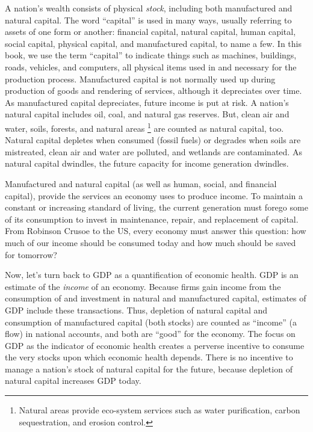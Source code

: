 A nation's wealth consists of physical \emph{stock},  
including both manufactured and natural capital. 
The word ``capital'' is used in many ways, usually referring to assets
of one form or another: 
financial capital, 
natural capital, 
human capital, 
social capital,
physical capital, and
manufactured capital, 
to name a few.
In this book, 
we use the term ``capital'' to indicate things such as
machines, 
buildings, 
roads,
vehicles, and
computers,
all physical items used in and necessary for the production process.
Manufactured capital is not normally used up during production 
of goods and rendering of services, 
although it depreciates over time.
As manufactured capital depreciates, future income is put at risk.
A nation's natural capital includes oil, coal, and natural gas reserves.
But, clean air and water, soils, forests, and natural areas%
	\footnote{
	Natural areas provide eco-system services such as 
	water purification, 
	carbon sequestration, 
	and erosion control.
	}
are counted as natural capital, too.
Natural capital depletes when consumed (fossil fuels)
or degrades when 
soils are mistreated, 
clean air and water are polluted, 
and wetlands are contaminated. 
As natural capital dwindles, the future
capacity for income generation dwindles. 

Manufactured and natural capital
(as well as human, social, and financial capital), 
provide the services an economy uses to produce income. 
To maintain a constant or increasing
standard of living, the current generation must
forego some of its consumption to 
invest in maintenance, repair, and
replacement of capital. 
From Robinson Crusoe to the US, 
every economy must answer this question: 
how much of our income should be consumed today and how much should be saved
for tomorrow?

Now, let's turn back to GDP as a quantification of economic health.
GDP is an estimate of the \emph{income} of an economy.
Because firms gain income from the 
consumption of and investment in 
natural and manufactured capital,
estimates of GDP include these transactions.
Thus, depletion of natural capital and
consumption of manufactured capital (both stocks) 
are counted as ``income'' (a flow) in national accounts,
and both are ``good'' for the economy.
The focus on GDP as the indicator of economic health
creates a perverse incentive to consume the very stocks upon which
economic health depends. 
There is no incentive to manage 
a nation's stock of natural capital for the future, 
because depletion of natural capital increases
GDP today.

